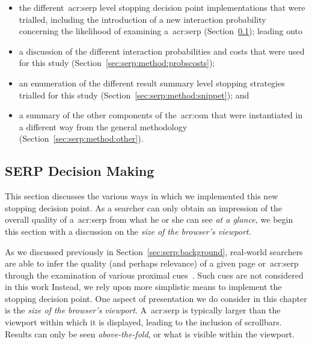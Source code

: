 \begin{itemize}
    \item{the different~\gls{acr:serp} level stopping decision point implementations that were trialled, including the introduction of a new interaction probability concerning the likelihood of examining a~\gls{acr:serp} (Section~\ref{sec:serp:method:serp_dp}); leading onto}
    \item{a discussion of the different interaction probabilities and costs that were used for this study (Section~\ref{sec:serp:method:probscosts});}
    \item{an enumeration of the different result summary level stopping strategies trialled for this study (Section~\ref{sec:serp:method:snippet}); and}
    \item{a summary of the other components of the~\gls{acr:csm} that were instantiated in a different way from the general methodology (Section~\ref{sec:serp:method:other}).}
\end{itemize}

\subsection{SERP Decision Making}\label{sec:serp:method:serp_dp}
This section discusses the various ways in which we implemented this new stopping decision point. As a searcher can only obtain an impression of the overall quality of a~\gls{acr:serp} from what he or she can see \emph{at a glance,} we begin this section with a discussion on the \emph{size of the browser's viewport.}

As we discussed previously in Section~\ref{sec:serp:background}, real-world searchers are able to infer the quality (and perhaps relevance) of a given page or~\gls{acr:serp} through the examination of various proximal cues~\citep{chi2001information_scent}. Such cues are not considered in this work Instead, we rely upon more simplistic means to implement the stopping decision point. One aspect of presentation we do consider in this chapter is the \emph{size of the browser's viewport}. A~\gls{acr:serp} is typically larger than the viewport within which it is displayed, leading to the inclusion of scrollbars. Results can only be seen \emph{above-the-fold}, or what is visible within the viewport.

